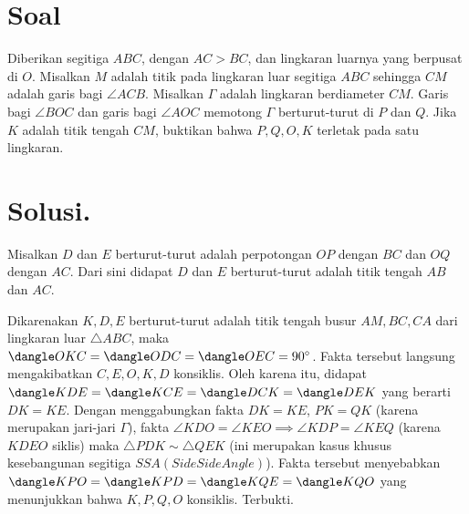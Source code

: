 \section{Soal}
Diberikan segitiga $ABC$, dengan $AC > BC$, dan lingkaran luarnya yang berpusat di $O$. Misalkan $M$ adalah titik pada lingkaran luar segitiga $ABC$ sehingga $CM$ adalah garis bagi $\angle ACB$. Misalkan $\Gamma$ adalah lingkaran berdiameter $CM$. Garis bagi $\angle BOC$ dan garis bagi $\angle AOC$ memotong $\Gamma$ berturut-turut di $P$ dan $Q$. Jika $K$ adalah titik tengah $CM$, buktikan bahwa $P, Q, O, K$ terletak pada satu lingkaran.



\newpage
\section{Solusi.}
    

    Misalkan $D$ dan $E$ berturut-turut adalah perpotongan $OP$ dengan $BC$ dan $OQ$ dengan $AC$. Dari sini didapat $D$ dan $E$ berturut-turut adalah titik tengah $AB$ dan $AC$.

    Dikarenakan $K,D,E$ berturut-turut adalah titik tengah busur $AM, BC, CA$ dari lingkaran luar $\triangle ABC$, maka $\dangle OKC = \dangle ODC = \dangle OEC = 90^\circ$. Fakta tersebut langsung mengakibatkan $C,E,O,K,D$ konsiklis.
    Oleh karena itu, didapat $\dangle KDE = \dangle KCE = \dangle DCK = \dangle DEK$ yang berarti $DK=KE$.
    Dengan menggabungkan fakta $DK = KE$, $PK=QK$ (karena merupakan jari-jari $\Gamma$), fakta $\angle KDO = \angle KEO \implies \angle KDP = \angle KEQ$ (karena $KDEO$ siklis) maka $\triangle PDK \sim \triangle QEK$ (ini merupakan kasus khusus kesebangunan segitiga $SSA (Side Side Angle)$).
    Fakta tersebut menyebabkan $\dangle KPO = \dangle KPD = \dangle KQE = \dangle KQO$ yang menunjukkan bahwa $K,P,Q,O$ konsiklis. Terbukti.

